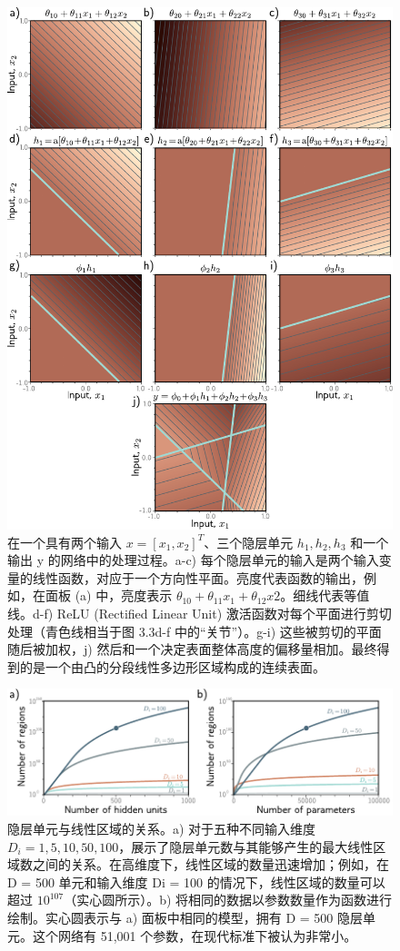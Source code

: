 \documentclass[lang=cn,newtx,10pt,scheme=chinese]{elegantbook}
\begin{document}
\begin{figure}[ht!]
	\centering
	\includegraphics[width=0.7\linewidth]{PDFFigures/UDLChap3PDF/ShallowBuildUp2D.pdf}
\caption{在一个具有两个输入 \(x = [x_1,x_2]^T\)、三个隐层单元 \(h_1,h_2,h_3\) 和一个输出 y 的网络中的处理过程。a-c) 每个隐层单元的输入是两个输入变量的线性函数，对应于一个方向性平面。亮度代表函数的输出，例如，在面板 (a) 中，亮度表示 \(\theta_10 + \theta_{11}x_1 + \theta_{12} x2\)。细线代表等值线。d-f) ReLU (Rectified Linear Unit) 激活函数对每个平面进行剪切处理（青色线相当于图 3.3d-f 中的“关节”）。g-i) 这些被剪切的平面随后被加权，j) 然后和一个决定表面整体高度的偏移量相加。最终得到的是一个由凸的分段线性多边形区域构成的连续表面。}
\end{figure}

\begin{figure}[ht!]
	\centering
	\includegraphics[width=0.7\linewidth]{PDFFigures/UDLChap3PDF/ShallowRegions.pdf}
\caption{隐层单元与线性区域的关系。a) 对于五种不同输入维度 \(D_i = {1, 5, 10, 50, 100}\)，展示了隐层单元数与其能够产生的最大线性区域数之间的关系。在高维度下，线性区域的数量迅速增加；例如，在 D = 500 单元和输入维度 Di = 100 的情况下，线性区域的数量可以超过 $10^{107}$（实心圆所示）。b) 将相同的数据以参数数量作为函数进行绘制。实心圆表示与 a) 面板中相同的模型，拥有 D = 500 隐层单元。这个网络有 51,001 个参数，在现代标准下被认为非常小。}
\end{figure}
\end{document}
